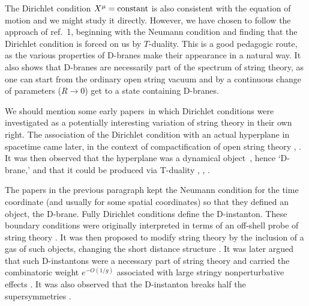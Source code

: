 \documentclass[12pt]{article}
\begin{document}
The Dirichlet condition $X^\mu= {\rm constant}$
is also consistent with the equation of motion and we might study it
directly.  However, we have chosen to follow the approach of ref.~1, beginning
with the Neumann condition and finding that the Dirichlet condition is forced
on us by
$T$-duality.  This is a good pedagogic route, as the various properties of
D-branes make their appearance in a natural way.  It also shows that D-branes
are necessarily part of the spectrum of string theory, as one can start from
the ordinary open string vacuum and by a continuous change of parameters ($R
\to 0$) get to a state containing D-branes.

We should mention some early papers\, \cite{early} in which
Dirichlet conditions were investigated as a potentially interesting variation
of string theory in their own right.  The association of the Dirichlet
condition with an actual hyperplane in spacetime came later, in the context of
compactification of open string theory \cite{latera}, \cite{laterc}. It
was then observed that the hyperplane was a dynamical object\, \cite{dlp}, hence
`D-brane,' and that it could be produced via 
T-duality \cite{dlp}, \cite{hdual}, \cite{gdual}.

The papers in the previous paragraph kept the Neumann condition for the time
coordinate (and usually for some spatial coordinates) so that they defined
an object, the D-brane.  Fully Dirichlet conditions define the D-instanton. 
These boundary conditions were originally interpreted in terms of an off-shell
probe of string theory \cite{offshell}.  It was then proposed to modify string
theory by the inclusion of a gas of such objects, changing the short distance
structure \cite{parton}.  It was later argued\, \cite{joecomb} that such
D-instantons were a necessary part of string theory and carried the
combinatoric weight $e^{-O(1/g)}$ associated with large stringy
nonperturbative effects \cite{shenk1}. It was also observed that the
D-instanton breaks half the supersymmetries \cite{gdinst}. 
\end{document}
